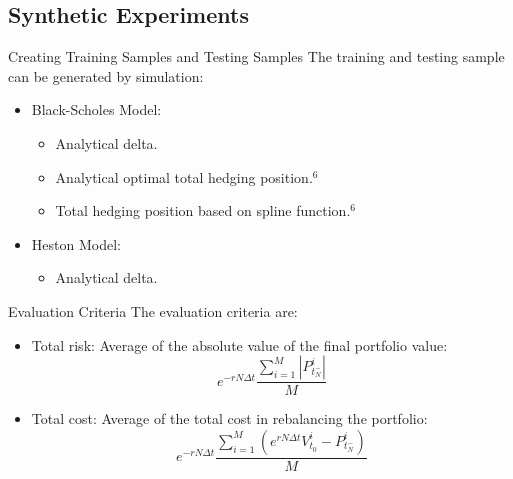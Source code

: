 \documentclass[10pt,table,mathserif]{beamer}
\begin{document}
\subsection{Synthetic Experiments}
\begin{frame}{Creating Training Samples and Testing Samples}
The training and testing sample can be generated by simulation:
\begin{itemize}
	\item Black-Scholes Model:
	\begin{itemize}
		\item Analytical delta.
		\item Analytical optimal total hedging position$.^6$
		\item Total hedging position based on spline function$.^6$
	\end{itemize}
	\item Heston Model:
	\begin{itemize}
		\item Analytical delta.
	\end{itemize}
\end{itemize}
\end{frame}

\begin{frame}{Evaluation Criteria}
The evaluation criteria are:
\begin{itemize}
	\item Total risk: Average of the absolute value of the final portfolio value:
	\[ 
	e^{-r N \Delta t}\frac{\sum_{i=1}^{M}|P^i_{t_N^-}|}{M}
	\]
	\item Total cost: Average of the total cost in rebalancing the portfolio:
	\[
	e^{-r N \Delta t} \frac{\sum_{i=1}^{M}(e^{r N \Delta t} V^i_{t_0}-P^i_{t_N^-})}{M}
	\]
\end{itemize}
\end{frame}
\end{document}
